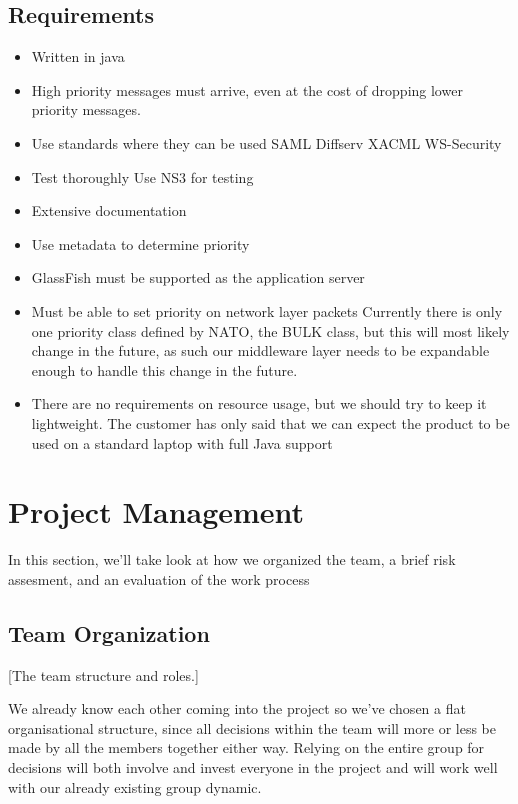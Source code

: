 \documentclass[12pt]{article}
\begin{document}
    \subsection{Requirements}\label{taskreq}
    \begin{itemize}
        \item Written in java
        \item High priority messages must arrive, even at the cost of dropping lower priority messages.
        \item Use standards where they can be used
            \subitem SAML
            \subitem Diffserv
            \subitem XACML
            \subitem WS-Security
        \item Test thoroughly
            \subitem Use NS3 for testing
        \item Extensive documentation
        \item Use metadata to determine priority
        \item GlassFish must be supported as the application server
        \item Must be able to set priority on network layer packets
            \subitem Currently there is only one priority class defined by NATO, the BULK class, but this will most likely change in the future, as such our middleware layer needs to be expandable enough to handle this change in the future.
        \item There are no requirements on resource usage, but we should try to keep it lightweight.
            \subitem The customer has only said that we can expect the product to be used on a standard laptop with full Java support
    \end{itemize}
    
\section{Project Management}\label{management} 
    In this section, we'll take look at how we organized the team, a brief risk assesment, and an evaluation of the work process 
    
    \subsection{Team Organization}\label{team} 
        [The team structure and roles.]
    
    We already know each other coming into the project so we’ve chosen a flat organisational structure, since all decisions within the team will more or less be made by all the members together either way. Relying on the entire group for decisions will both involve and invest everyone in the project and will work well with our already existing group dynamic.
\end{document}
